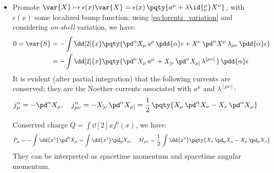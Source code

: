 \documentclass[a4paper,10pt]{article}
\begin{document}
\begin{itemize}
	\item Promote $
		\var{X}\mapsto \epsilon(x)\var{X}
		= \epsilon(x)\,\pqty{
			a^\mu + \lambda\id{^\mu_\nu} X^\nu
		}
	$, with $\epsilon(x)$ some localized bump function; using \eqref{eq:lorentz_variation} and considering \textit{on-shell} variation, we have:
	\begin{equation}
	\begin{aligned}
		0 = \var{S}
		&= - \int \dd[2]{x} \pqty{
			\pd^\alpha X_\mu\,
				a^\mu\,
				\pdd{\alpha}\epsilon
			+ X^\nu\,\pd^\alpha X^\mu\,
				\lambda_{\mu\nu}\,
				\pdd{\alpha}\epsilon
		} \\
		&= - \int \dd[2]{x} \pqty{
			\pd^\alpha X_\mu\,
				a^\mu\,
			+ X_{[\nu}\,\pd^\alpha X_{\mu]}\,
				\lambda^{[\mu\nu]}\,
		}\,\pdd{\alpha}\epsilon
	\end{aligned}
	\end{equation}
	It is evident (after partial integration) that the following currents are conserved; they are the Noether currents associated with $a^\mu$ and $\lambda^{[\mu\nu]}$:
	\begin{equation}
		j^\alpha_\mu
		= -\pd^\alpha X_\mu,\quad
		j^\alpha_{\mu\nu}
		= -X_{[\nu}\,\pd^\alpha X_{\mu]}
		= \frac{1}{2}\,\pqty{
			X_\mu\,\pd^\alpha X_\nu
			- X_\nu\,\pd^\alpha X_\mu
		}
	\end{equation}
	
	Conserved charge $
		Q = \int\dd[2]{x} j^0(x)
	$, we have:
	\begin{equation}
		P_\mu = - \int\dd{x^1} \pd^0 X_\mu
		= \int\dd{x^1} \pd_0 X_\mu,\quad
		M_{\mu\nu}
		= \frac{1}{2}\,\int\dd{x^1}\pqty{
			X_\nu\,\pd_0 X_\mu
			- X_\mu\,\pd_0 X_\nu
		}
	\end{equation}
	They can be interpreted as spacetime momentum and spacetime angular momentum. 
	\qedfull
	\end{itemize}
\pagebreak[3]
\end{document}
